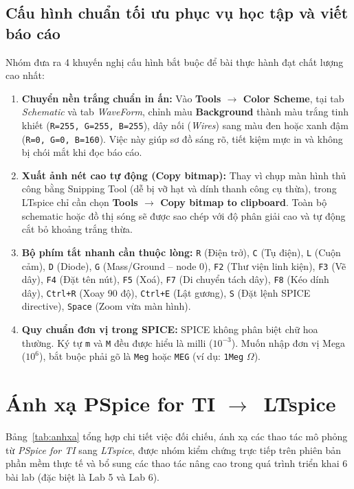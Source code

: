 \documentclass[12pt,a4paper]{article}
\newcommand{\ar}{\texorpdfstring{$\rightarrow$}{->}}
\begin{document}
\subsection{Cấu hình chuẩn tối ưu phục vụ học tập và viết báo cáo}
Nhóm đưa ra 4 khuyến nghị cấu hình bắt buộc để bài thực hành đạt chất lượng cao nhất:
\begin{enumerate}[itemsep=2pt]
  \item \textbf{Chuyển nền trắng chuẩn in ấn:} Vào \textbf{Tools $\rightarrow$ Color Scheme}, tại tab \textit{Schematic} và tab \textit{WaveForm}, chỉnh màu \textbf{Background} thành màu trắng tinh khiết (\texttt{R=255, G=255, B=255}), dây nối (\textit{Wires}) sang màu đen hoặc xanh đậm (\texttt{R=0, G=0, B=160}). Việc này giúp sơ đồ sáng rõ, tiết kiệm mực in và không bị chói mắt khi đọc báo cáo.
  \item \textbf{Xuất ảnh nét cao tự động (Copy bitmap):} Thay vì chụp màn hình thủ công bằng Snipping Tool (dễ bị vỡ hạt và dính thanh công cụ thừa), trong LTspice chỉ cần chọn \textbf{Tools $\rightarrow$ Copy bitmap to clipboard}. Toàn bộ schematic hoặc đồ thị sóng sẽ được sao chép với độ phân giải cao và tự động cắt bỏ khoảng trắng thừa.
  \item \textbf{Bộ phím tắt nhanh cần thuộc lòng:} \texttt{R} (Điện trở), \texttt{C} (Tụ điện), \texttt{L} (Cuộn cảm), \texttt{D} (Diode), \texttt{G} (Mass/Ground -- node 0), \texttt{F2} (Thư viện linh kiện), \texttt{F3} (Vẽ dây), \texttt{F4} (Đặt tên nút), \texttt{F5} (Xoá), \texttt{F7} (Di chuyển tách dây), \texttt{F8} (Kéo dính dây), \texttt{Ctrl+R} (Xoay 90 độ), \texttt{Ctrl+E} (Lật gương), \texttt{S} (Đặt lệnh SPICE directive), \texttt{Space} (Zoom vừa màn hình).
  \item \textbf{Quy chuẩn đơn vị trong SPICE:} SPICE không phân biệt chữ hoa thường. Ký tự \texttt{m} và \texttt{M} đều được hiểu là milli ($10^{-3}$). Muốn nhập đơn vị Mega ($10^6$), bắt buộc phải gõ là \texttt{Meg} hoặc \texttt{MEG} (ví dụ: \texttt{1Meg} $\Omega$).
\end{enumerate}

\section{Ánh xạ PSpice for TI \ar\ LTspice}

Bảng~\ref{tab:anhxa} tổng hợp chi tiết việc đối chiếu, ánh xạ các thao tác mô phỏng từ \textit{PSpice for TI} sang \textit{LTspice}, được nhóm kiểm chứng trực tiếp trên phiên bản phần mềm thực tế và bổ sung các thao tác nâng cao trong quá trình triển khai 6 bài lab (đặc biệt là Lab 5 và Lab 6).
\end{document}
